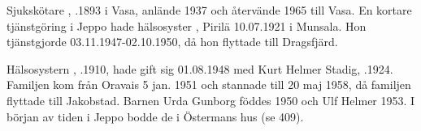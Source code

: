 Sjukskötare , .1893 i Vasa, anlände 1937 och återvände 1965 till Vasa. En kortare tjänstgöring i Jeppo hade hälsosyster , \textborn Pirilä 10.07.1921 i Munsala. Hon tjänstgjorde 03.11.1947-02.10.1950, då hon flyttade till Dragsfjärd.

Hälsosystern , .1910, hade gift sig 01.08.1948 med Kurt Helmer Stadig, .1924. Familjen kom  från Oravais 5 jan. 1951 och stannade till 20 maj 1958, då familjen flyttade till Jakobstad. Barnen Urda Gunborg föddes 1950 och Ulf Helmer 1953. I början av tiden i Jeppo bodde de i Östermans hus (se 409).
